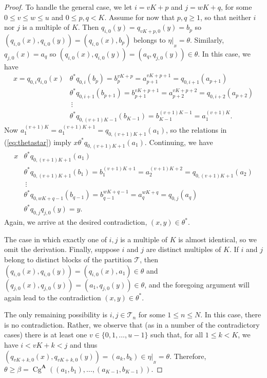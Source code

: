 \documentclass{au}
\numberwithin{equation}{section}
\theoremstyle{plain}
\theoremstyle{definition}
\newcommand{\<}{\ensuremath{\langle}}
\renewcommand{\>}{\ensuremath{\rangle}}
\newcommand{\bA}{\ensuremath{\mathbf{A}}}
\newcommand{\sT}{\ensuremath{\mathscr{T}}}
\DeclareMathOperator{\Cg}{Cg}
\renewcommand{\leq}{\ensuremath{\leqslant}}
\renewcommand{\geq}{\ensuremath{\geqslant}}
\newcommand{\resB}{\ensuremath{|_{_B}}}
\begin{document}
\begin{proof}
To handle the general case, we let $i = vK+p$ and $j=wK+q$, for some $0\leq v \leq w \leq u$ and $0\leq p, q <
K$.  Assume for now that $p, q \geq 1$, so that neither $i$ nor $j$ is a
multiple of $K$.  Then
$q_{i,0}(y)= q_{vK+p,0}(y)=
b_{p}$ so $(q_{i,0}(x),q_{i,0}(y)) =
(q_{i,0}(x), b_{p})$ belongs to
$\eta\resB = \theta$.  Similarly,
$q_{j,0}(x)=
a_{q}$ so
$(q_{i,0}(x),q_{i,0}(y)) =
(a_q, q_{j,0}(y)) \in \theta$.
In this case, we have
\begin{align}
\label{eq:thetastar}
  x=q_{0,i}q_{i,0}(x) & \mathrel{\theta^*} q_{0,i}(b_p) = b_p^{vK+p} = a^{vK+p+1}_{p+1} = q_{0,i+1}(a_{p+1})\nonumber\\
  & \mathrel{\theta^*} q_{0,i+1} (b_{p+1})= b^{vK+p+1}_{p+1} = a^{vK+p+2}_{p+2} = q_{0,i+2}(a_{p+2})\nonumber\\
  &\ \vdots\\ %
  & \mathrel{\theta^*} q_{0,(v+1)K-1} (b_{K-1}) = b^{(v+1)K-1}_{K-1} = a^{(v+1)K}_1.\nonumber
\end{align}
Now $a^{(v+1)K}_1=a^{(v+1)K+1}_1=q_{0,(v+1)K+1}(a_1)$, so the relations in (\ref{eq:thetastar}) imply
$x \mathrel{\theta^*} q_{0,(v+1)K+1}(a_1)$.  Continuing, we have
\begin{align*}
  x &\mathrel{\theta^*}q_{0,(v+1)K+1}(a_1)\\
 &\mathrel{\theta^*} q_{0,(v+1)K+1}(b_1) = b^{(v+1)K+1}_{1} = a^{(v+1)K+2}_2=q_{0,(v+1)K+1}(a_2) \\
  &\ \vdots\\ %
  &\mathrel{\theta^*}q_{0,wK+q-1}(b_{q-1}) = b^{wK+q-1}_{q-1} = a^{wK+q}_q=q_{0,j}(a_q)\\
  &\mathrel{\theta^*} q_{0,j} q_{j,0}(y) = y.
\end{align*}
Again, we arrive at the desired contradiction, $(x,y)\in \theta^*$.

The case in which exactly one of $i, j$ is a multiple of $K$ is almost
identical, so we omit the derivation.
Finally, suppose $i$ and $j$ are distinct multiples of $K$.  If $i$ and $j$
belong to distinct blocks of the partition $\sT$, then
$(q_{i,0}(x), q_{i,0}(y)) = (q_{i,0}(x), a_1) \in \theta$ and
$(q_{j,0}(x), q_{j,0}(y)) = (a_1, q_{j,0}(y)) \in \theta$, and the
foregoing argument will again lead to the contradiction
$(x,y)\in \theta^*$.

The only remaining possibility is $i, j \in \sT_n$ for some $1\leq n\leq N$.
In this case, there is no contradiction.
Rather, we observe that
(as in a number of the contradictory cases)
there is at least one $v \in
\{0, 1, \dots,u-1\}$ such that, for all
$1\leq k < K$, we have $i< vK+k < j$ and thus
$(q_{vK+k,0}(x),q_{vK+k,0}(y)) = (a_k, b_k) \in \eta\resB = \theta$.
Therefore,
 $\theta \geq \beta = \Cg^{\bA}((a_1, b_1), \dots, (a_{K-1}, b_{K-1}))$.
\end{proof}
\end{document}
